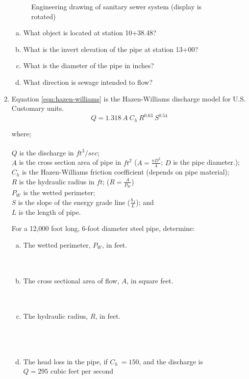 \documentclass[11pt]{article}
\newcommand\tab[1][1cm]{\hspace*{#1}}
\begin{document}
\begin{enumerate}
\begin{figure}[h!]
   \caption{Engineering drawing of sanitary sewer system (display is rotated)}
   \label{fig:SewerDrawing}
\end{figure}

\begin{enumerate}[(a)]
\item What object is located at station 10+38.48?
\item What is the invert elevation of the pipe at station 13+00?
\item What is the diameter of the pipe in inches?
\item What direction is sewage intended to flow?
\end{enumerate}
\clearpage
\item Equation \ref{eqn:hazen-williams} is the  Hazen-Williams discharge model for U.S. Customary units.
\begin{equation}
Q = 1.318~A~C_h~R^{0.63}~S^{0.54}
\label{eqn:hazen-williams}
\end{equation}

where;\\~\\
\tab $Q$ is the discharge in $ft^3/sec$;\\
\tab $A$ is the cross section area of pipe in $ft^2$ ($A = \frac{\pi D^2}{4}$; $D$ is the pipe diameter.);\\
\tab $C_h$ is the Hazen-Williams friction coefficient (depends on pipe material);\\
\tab $R $ is the hydraulic radius in $ft$;  ($R=\frac{A}{P_W}$)\\
\tab $P_W$ is the wetted perimeter; \\
\tab $S$ is the slope of the energy grade line ($\frac{h_f}{L}$); and \\
\tab $L$ is the length of pipe.

For a 12,000 foot long, 6-foot diameter steel pipe, determine:
\begin{enumerate}[(a)]
\item The wetted perimeter, $P_W$, in feet. \\~\\~\\
\item The cross sectional area of flow, $A$, in square feet. \\~\\~\\
\item The hydraulic radius, $R$, in feet. \\~\\~\\~\\
\item The head loss in the pipe, if $C_h~=150$, and the discharge is $Q=295\text{~cubic feet per second}$


\end{enumerate}
\end{enumerate}
\end{document}
